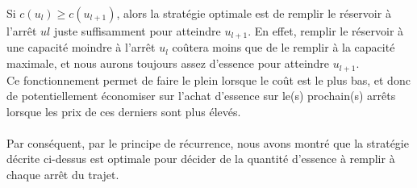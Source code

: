 \documentclass[a4paper,11pt]{article}
\begin{document}
{Si $c(u_l) \geq c(u_{l + 1})$, alors la stratégie optimale est de remplir le réservoir à l'arrêt $ul$ juste suffisamment pour atteindre $u_{l + 1}$. En effet, remplir le réservoir à une capacité moindre à l'arrêt $u_l$ coûtera moins que de le remplir à la capacité maximale, et nous aurons toujours assez d'essence pour atteindre $u_{l + 1}$.
\\Ce fonctionnement permet de faire le plein lorsque le coût est le plus bas, et donc de potentiellement économiser sur l’achat d’essence sur le(s) prochain(s) arrêts lorsque les prix de ces derniers sont plus élevés.
\\\\
Par conséquent, par le principe de récurrence, nous avons montré que la stratégie décrite ci-dessus est optimale pour décider de la quantité d'essence à remplir à chaque arrêt du trajet.   
\\\\}
\end{document}
